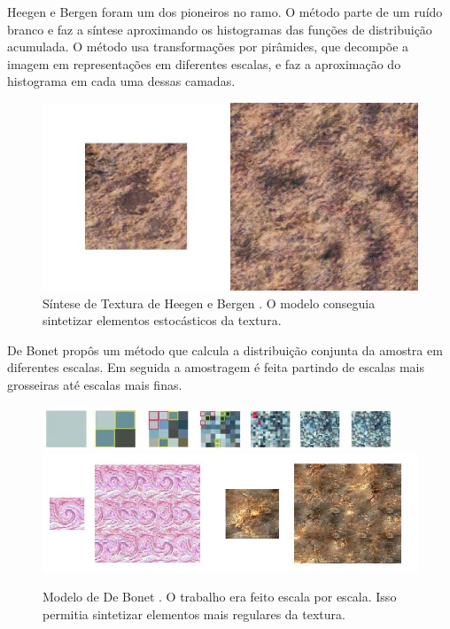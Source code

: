
Heegen e Bergen \cite{Heeger1995} foram
um dos pioneiros no ramo. O método
parte de um ruído branco e faz a síntese
aproximando os histogramas das funções
de distribuição acumulada.
O método usa transformações
por pirâmides, que decompõe a imagem
em representações em diferentes escalas,
e faz a aproximação do histograma
em cada uma dessas camadas.

\begin{figure}[!ht]
	\centering
	\includegraphics[width=\linewidth*2/3]{files/assets/articles/bergen.png}
	\caption{Síntese de Textura de Heegen e Bergen \cite{Heeger1995}.
	O modelo conseguia sintetizar elementos estocásticos da textura.}
	\label{img:preview}
\end{figure}


De Bonet \cite{Bonet1997} propôs
um método que calcula a distribuição
conjunta da amostra em diferentes
escalas. Em seguida a amostragem
é feita partindo de escalas mais
grosseiras até escalas mais finas.

\begin{figure}[!ht]
	\includegraphics[width=\linewidth]{files/assets/articles/bonet2.png}
	\includegraphics[width=\linewidth]{files/assets/articles/bonet.png}
	\caption{Modelo de De Bonet \cite{Bonet1997}. O trabalho era feito escala
	por escala. Isso permitia sintetizar elementos mais regulares
    da textura.}
	\label{img:preview}
\end{figure}

